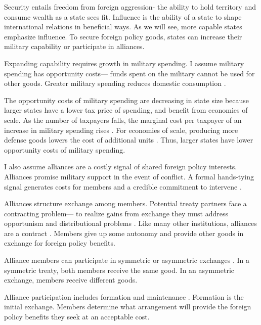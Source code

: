 \documentclass[12pt]{article}
\begin{document}
Security entails freedom from foreign aggression- the ability to hold territory and consume wealth as a state sees fit. 
Influence is the ability of a state to shape international relations in beneficial ways. 
As we will see, more capable states emphasize influence. 
To secure foreign policy goods, states can increase their military capability or participate in alliances. 


Expanding capability requires growth in military spending. 
I assume military spending has opportunity costs--- funds spent on the military cannot be used for other goods. 
Greater military spending reduces domestic consumption \citep{Fearon2018}. 


The opportunity costs of military spending are decreasing in state size because larger states have a lower tax price of spending, and benefit from economies of scale. 
As the number of taxpayers falls, the marginal cost per taxpayer of an increase in military spending rises \citep{DudleyMontmarquette1981}. 
For economies of scale, producing more defense goods lowers the cost of additional units \citep{Moravcsik1991, AlesinaSpolaore2006}. 
Thus, larger states have lower opportunity costs of military spending. 


I also assume alliances are a costly signal of shared foreign policy interests. 
Alliances promise military support in the event of conflict. 
A formal hands-tying signal generates costs for members and a credible commitment to intervene \citep{Fearon1997, Leeds2003}.


Alliances structure exchange among members. 
Potential treaty partners face a contracting problem--- to realize gains from exchange they must address opportunism and distributional problems \citep{Williamson1985, Koremenosetal2001}. 
Like many other institutions, alliances are a contract \citep{Lake1996, Bensonetal2014}. 
Members give up some autonomy and provide other goods in exchange for foreign policy benefits. 


Alliance members can participate in symmetric or asymmetric exchanges \citet{Morrow1991}.
In a symmetric treaty, both members receive the same good. 
In an asymmetric exchange, members receive different goods.  


Alliance participation includes formation and maintenance \citep{Snyder1997}. 
Formation is the initial exchange. 
Members determine what arrangement will provide the foreign policy benefits they seek at an acceptable cost. 
\end{document}
